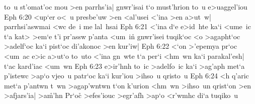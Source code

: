 to~u
st'omat'oc
mou
>en
parrhs'ia|
gnwr'isai
t`o
must'hrion
to~u
e>uaggel'iou\bibvsend
\vs Eph 6:20
<up`er
o<~u
presbe'uw
>en
<al'usei
<'ina
>en
a>ut~w|
parrhsi'aswmai
<wc
de~i
me
lal~hsai\bibvsend
\vs Eph 6:21
<'ina
d`e
e>id~hte
ka`i
<ume~ic
t`a
kat>
>em`e
t'i
pr'assw
p'anta
<um~in\r{}
gnwr'isei
tuqik`oc
<o
>agapht`oc
>adelf`oc
ka`i
pist`oc
di'akonoc
>en
kur'iw|\bibvsend
\vs Eph 6:22
<`on
>'epemya
pr`oc
<um~ac
e>ic
a>ut`o
to~uto
<'ina
gn~wte
t`a
per`i
<hm~wn
ka`i
parakal'esh|
t`ac
kard'iac
<um~wn\bibvsend
\vs Eph 6:23
e>ir'hnh
to~ic
>adelfo~ic
ka`i
>ag'aph
met`a
p'istewc
>ap`o
vjeo~u
patr`oc
ka`i
kur'iou
>ihso~u
qristo~u\bibvsend
\vs Eph 6:24
<h
q'aric
met`a
p'antwn
t~wn
>agap'wntwn
t`on
k'urion
<hm~wn
>ihso~un
qrist`on
>en
>afjars'ia|
>a\r{m}'hn\bibvsend
{}
Pr`oc\r{}
>efes'iouc
>egr'afh
>ap`o
<r'wmhc
di`a
tuqiko~u\bibvsend
